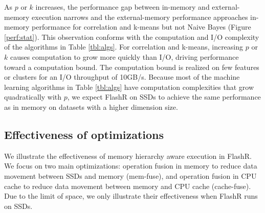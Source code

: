 As $p$ or $k$ increases, the performance gap between
in-memory and external-memory execution narrows and the external-memory
performance approaches in-memory performance for correlation and k-means
but not Naive Bayes (Figure \ref{perf:stat}). This observation conforms with
the computation and I/O complexity of the algorithms in Table \ref{tbl:algs}.
For correlation and k-means, increasing $p$ or $k$ causes computation
to grow more quickly than I/O, driving performance toward a computation bound.
The computation bound is realized on few features or clusters for an I/O throughput
of 10GB/s. Because most of the machine learning algorithms in Table \ref{tbl:algs} have
computation complexities that grow quadratically with $p$, we expect FlashR on SSDs to
achieve the same performance as in memory on datasets with a higher dimension size.


\subsection{Effectiveness of optimizations}
We illustrate the effectiveness of memory hierarchy aware execution in FlashR.
We focus on two main optimizations: operation fusion in memory
to reduce data movement between SSDs and memory (mem-fuse), and
operation fusion in CPU cache to reduce data movement between memory and
CPU cache (cache-fuse). Due to the limit of space, we only illustrate their
effectiveness when FlashR runs on SSDs.

